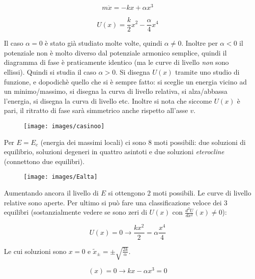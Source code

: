 \documentclass[Main.tex]{subfiles}
\begin{document}
\begin{appendic}
\begin{equation}
  m \ddot x = - kx + \alpha x^3
\end{equation}

\begin{equation}
  U(x)= \frac{k}{2}x^2 - \frac{\alpha}{4}x^4
\end{equation}

Il caso $\alpha=0$ è stato già studiato molte volte, quindi $\alpha \neq 0$. Inoltre per $\alpha <0$ il potenziale non è molto diverso dal potenziale armonico semplice, quindi il diagramma di fase è praticamente identico (ma le curve di livello \textit{non} sono ellissi).
Quindi si studia il caso $\alpha >0$. Si disegna $U(x)$ tramite uno studio di funzione, e dopodichè quello che si è sempre fatto: si sceglie un energia vicino ad un minimo/massimo, si disegna la curva di livello relativa, si alza/abbassa l'energia, si disegna la curva di livello etc. Inoltre si nota che siccome $U(x)$ è pari, il ritratto di fase sarà simmetrico anche rispetto all'asse $v$.

\begin{figure}[H]
    \centering
    \texttt{[image: images/casinoo]}
\end{figure}

 Per $E=E_c$ (energia dei massimi locali) ci sono 8 moti possibili: due soluzioni di equilibrio, soluzioni degeneri in quattro asintoti e due soluzioni \textit{eterocline} (connettono due equilibri).

\begin{figure}[H]
    \centering
    \texttt{[image: images/Ealta]}
\end{figure}

 Aumentando ancora il livello di $E$ si ottengono 2 moti possibili. Le curve di livello relative sono aperte.
Per ultimo si può fare una classificazione veloce dei 3 equilibri (sostanzialmente vedere se sono zeri di $U(x)$ con $\frac{d^2 U}{dx^2}(x) \neq 0$):

\begin{equation}
  U(x) = 0 \longrightarrow \frac{kx^2}{2}= \alpha \frac{x^4}{4}
\end{equation}

Le cui soluzioni sono $x=0$ e $\tilde x _ \pm = \pm \sqrt{\frac{2k}{\alpha}}$.

\begin{equation}
  (x)=0 \longrightarrow kx -\alpha x^3 = 0
\end{equation}


\end{appendic}
\end{document}
